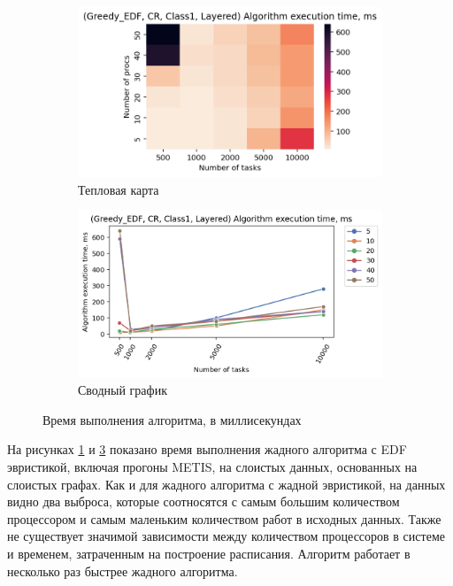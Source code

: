 \begin{figure}[!htbp]
    \centering
    \begin{subfigure}{0.49\textwidth}
        \includegraphics[width=\textwidth]{imgs/layered_class_1/CR_EDF/et_heatmap.png}
        \caption{Тепловая карта}
        \label{fig:CR-layered-EDF-exec-time-heatmap}
    \end{subfigure}
    \hfill
    \begin{subfigure}{0.49\textwidth}
        \includegraphics[width=\textwidth]{imgs/layered_class_1/CR_EDF/tr_graph.png}
        \caption{Сводный график}
        \label{fig:CR-layered-EDF-exec-time-compiled}
    \end{subfigure}
    \caption{Время выполнения алгоритма, в миллисекундах}
\end{figure}

На рисунках \ref{fig:CR-layered-EDF-exec-time-heatmap} и \ref{fig:CR-layered-EDF-exec-time-compiled} показано время выполнения жадного алгоритма с EDF эвристикой, включая прогоны METIS, на слоистых данных, основанных на слоистых графах. Как и для жадного алгоритма с жадной эвристикой, на данных видно два выброса, которые соотносятся с самым большим количеством процессором и самым маленьким количеством работ в исходных данных. Также не существует значимой зависимости между количеством процессоров в системе и временем, затраченным на построение расписания. Алгоритм работает в несколько раз быстрее жадного алгоритма.

